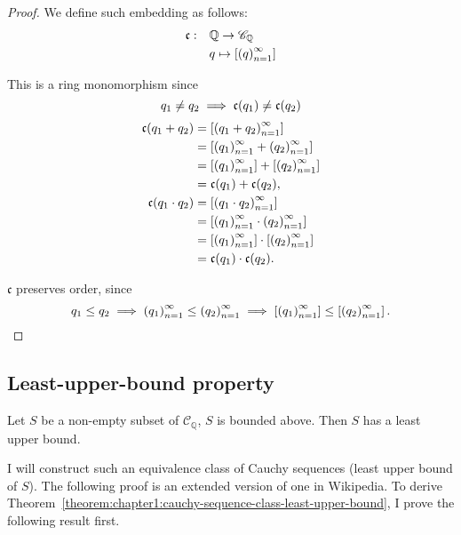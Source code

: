 \begin{proof}
    We define such embedding as follows:
    \begin{align*}
        \mathfrak{c}:\quad & \mathbb{Q}\to\mathscr{C}_{\mathbb{Q}} \\
                           & q\mapsto \left[{{\left({q}\right)}^{\infty}_{n=1}}\right]
    \end{align*}

    This is a ring monomorphism since
    \[
        q_{1}\ne q_{2}\implies \mathfrak{c}(q_{1})\ne\mathfrak{c}(q_{2}) \\
    \]
    \begin{align*}
        \mathfrak{c}(q_{1} + q_{2})    & = \left[{{\left({q_{1} + q_{2}}\right)}^{\infty}_{n=1}}\right]                  \\
                                       & = \left[{{\left({q_{1}}\right)}^{\infty}_{n=1} + {\left({q_{2}}\right)}^{\infty}_{n=1}}\right]            \\
                                       & = \left[{{\left({q_{1}}\right)}^{\infty}_{n=1}}\right] + \left[{{\left({q_{2}}\right)}^{\infty}_{n=1}}\right]    \\
                                       & = \mathfrak{c}(q_{1}) + \mathfrak{c}(q_{2}),   \\
        \mathfrak{c}(q_{1}\cdot q_{2}) & = \left[{{\left({q_{1}\cdot q_{2}}\right)}^{\infty}_{n=1}}\right]               \\
                                       & = \left[{{\left({q_{1}}\right)}^{\infty}_{n=1}\cdot{\left({q_{2}}\right)}^{\infty}_{n=1}}\right]          \\
                                       & = \left[{{\left({q_{1}}\right)}^{\infty}_{n=1}}\right]\cdot\left[{{\left({q_{2}}\right)}^{\infty}_{n=1}}\right]  \\
                                       & = \mathfrak{c}(q_{1})\cdot\mathfrak{c}(q_{2}).
    \end{align*}

    $\mathfrak{c}$ preserves order, since
    \[
        q_{1}\le q_{2}\implies{\left({q_{1}}\right)}^{\infty}_{n=1}\le{\left({q_{2}}\right)}^{\infty}_{n=1}\implies\left[{{\left({q_{1}}\right)}^{\infty}_{n=1}}\right]\le\left[{{\left({q_{2}}\right)}^{\infty}_{n=1}}\right].
    \]
\end{proof}

\subsection{Least-upper-bound property}

\begin{theorem}\label{theorem:chapter1:cauchy-sequence-class-least-upper-bound}
    Let $S$ be a non-empty subset of $\mathscr{C}_{\mathbb{Q}}$, $S$ is bounded above. Then $S$ has a least upper bound.
\end{theorem}

I will construct such an equivalence class of Cauchy sequences (least upper bound of $S$). The following proof is an extended version of one in Wikipedia. To derive Theorem~\ref{theorem:chapter1:cauchy-sequence-class-least-upper-bound}, I prove the following result first.

